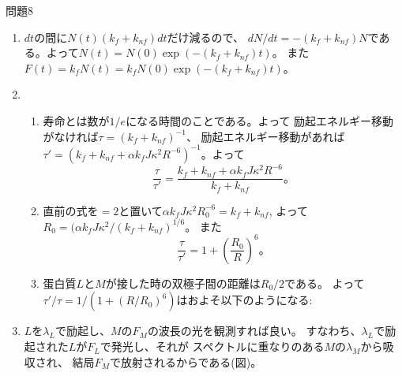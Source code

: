 \documentclass[fleqn]{jbook}
\begin{document}
\begin{answer}{問題8}{}
\begin{enumerate}
\item $dt$の間に$N(t)(k_f+k_{nf})dt$だけ減るので、
$dN/dt=-(k_f+k_{nf})N$である。よって$N(t)=N(0)\exp(-(k_f+k_{nf})t)$。
また$F(t)=k_fN(t)=k_fN(0)\exp(-(k_f+k_{nf})t)$。
\item 
\begin{enumerate}
\item 寿命とは数が$1/e$になる時間のことである。よって
励起エネルギー移動がなければ$\tau=(k_f+k_{nf})^{-1}$、
励起エネルギー移動があれば$\tau'=(k_f+k_{nf}+\alpha k_f J \kappa^2 R^{-6})^{-1}$。よって\[
\frac{\tau}{\tau'}=\frac{k_f+k_{nf}+\alpha k_f J \kappa^2 R^{-6}}{k_f+k_{nf}}。
\]
\item 直前の式を$=2$と置いて$\alpha k_f J \kappa^2 R_0^{-6}=k_f+k_{nf}$,
よって$R_0=(\alpha k_f J \kappa^2/(k_f+k_{nf})^{1/6}$。
また\[
\frac{\tau}{\tau'}=1+\left(\frac{R_0}{R}\right)^6。
\]
\item 蛋白質$L$と$M$が接した時の双極子間の距離は$R_0/2$である。
よって$\tau'/\tau=1/(1+(R/R_0)^6)$はおよそ以下のようになる:



\end{enumerate}
\item $L$を$\lambda_L$で励起し、$M$の$F_M$の波長の光を観測すれば良い。
すなわち、$\lambda_L$で励起された$L$が$F_L$で発光し、それが
スペクトルに重なりのある$M$の$\lambda_M$から吸収され、
結局$F_M$で放射されるからである(図)。
\begin{center}

\end{center}
\end{enumerate}
\end{answer}
\end{document}

